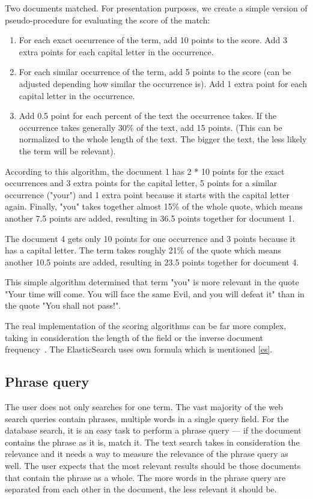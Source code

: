 Two documents matched. For presentation purposes, we create a simple version of pseudo-procedure for evaluating the score of the match:
\begin{enumerate}
\item For each exact occurrence of the term, add 10 points to the score. Add 3 extra points for each capital letter in the occurrence.
\item For each similar occurrence of the term, add 5 points to the score (can be adjusted depending how similar the occurrence is). Add 1 extra point for each capital letter in the occurrence.
\item Add 0.5 point for each percent of the text the occurrence takes. If the occurrence takes generally 30\% of the text, add 15 points. (This can be normalized to the whole length of the text. The bigger the text, the less likely the term will be relevant).
\end{enumerate}
According to this algorithm, the document 1 has 2 * 10 points for the exact occurrences and 3 extra points for the capital letter, 5 points for a similar occurrence ("your") and 1 extra point because it starts with the capital letter again. Finally, "you" takes together almost 15\% of the whole quote, which means another 7.5 points are added, resulting in 36.5 points together for document 1.

The document 4 gets only 10 points for one occurrence and 3 points because it has a capital letter. The term takes roughly 21\% of the quote which means another 10.5 points are added, resulting in 23.5 points together for document 4.

This simple algorithm determined that term "you" is more relevant in the quote "Your time will come. You will face the same Evil, and you will defeat it" than in the quote "You shall not pass!".

The real implementation of the scoring algorithms can be far more complex, taking in consideration the length of the field or the inverse document frequency~\cite{elastic}. The ElasticSearch uses own formula which is mentioned \autoref{es}.

\subsection{Phrase query}
The user does not only searches for one term. The vast majority of the web search queries contain phrases, multiple words in a single query field. For the database search, it is an easy task to perform a phrase query --- if the document contains the phrase as it is, match it. The text search takes in consideration the relevance and it needs a way to measure the relevance of the phrase query as well. The user expects that the most relevant results should be those documents that contain the phrase as a whole. The more words in the phrase query are separated from each other in the document, the less relevant it should be. 

